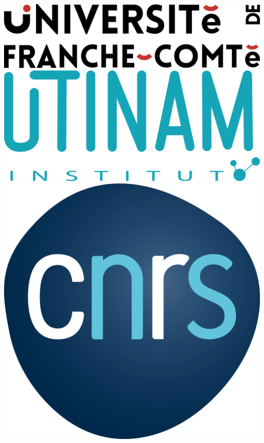 \documentclass[english]{article}
\begin{document}
\begin{titlepage}

    \begin{center}
        \includegraphics[scale=0.05]{rsc/logos/LOGO-UNIV-FC_COULEUR.png}
        \hspace{1cm}
        \includegraphics[scale=0.025]{rsc/logos/utinam.png}
        \hspace{1cm}
        \includegraphics[scale=0.04]{rsc/logos/CNRS.png}

\end{center}
\end{titlepage}
\end{document}
